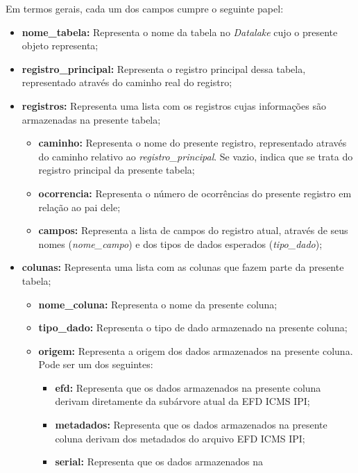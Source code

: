Em termos gerais, cada um dos campos cumpre o seguinte papel:
\begin{itemize}
    \item \textbf{nome\_tabela:} Representa o nome da tabela no
    \textit{Datalake} cujo o presente objeto representa;
    \item \textbf{registro\_principal:} Representa o registro principal dessa
    tabela, representado através do caminho real do registro;
    \item \textbf{registros:} Representa uma lista com os registros cujas
    informações são armazenadas na presente tabela;
    \begin{itemize}
        \item \textbf{caminho:} Representa o nome do presente registro,
        representado através do caminho relativo ao
        \textit{registro\_principal}. Se vazio, indica que se trata do
        registro principal da presente tabela;
        \item \textbf{ocorrencia:} Representa o número de ocorrências do
        presente registro em relação ao pai dele;
        \item \textbf{campos:} Representa a lista de campos do registro atual,
        através de seus nomes (\textit{nome\_campo}) e dos tipos de dados
        esperados (\textit{tipo\_dado});
    \end{itemize}
    \item \textbf{colunas:} Representa uma lista com as colunas que fazem
    parte da presente tabela;
    \begin{itemize}
        \item \textbf{nome\_coluna:} Representa o nome da presente coluna;
        \item \textbf{tipo\_dado:} Representa o tipo de dado armazenado na
        presente coluna;
        \item \textbf{origem:} Representa a origem dos dados armazenados na
        presente coluna. Pode ser um dos seguintes:
        \begin{itemize}
            \item \textbf{efd:} Representa que os dados armazenados na presente
            coluna derivam diretamente da subárvore atual da EFD ICMS IPI;
            \item \textbf{metadados:} Representa que os dados armazenados na
            presente coluna derivam dos metadados do arquivo EFD ICMS IPI;
            \item \textbf{serial:} Representa que os dados armazenados na

\end{itemize}
\end{itemize}
\end{itemize}
